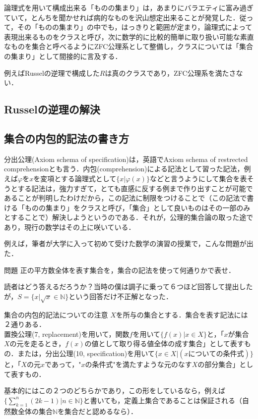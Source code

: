 \documentclass[uplatex, 12pt, a4paper, dvipdfmx]{jsreport}
\begin{document}
論理式を用いて構成出来る「ものの集まり」は，あまりにバラエティに富み過ぎていて，とんちを聞かせれば病的なものを沢山想定出来ることが発覚した．従って，その「ものの集まり」の中でも，はっきりと範囲が定まり，論理式によって表現出来るものをクラスと呼び，次に数学的に比較的簡単に取り扱い可能な素直なものを集合と呼べるようにZFC公理系として整備し，クラスについては「集合の集まり」として間接的に言及する．\par
例えばRusselの逆理で構成した$R$は真のクラスであり，ZFC公理系を満たさない．

\subsection{Russelの逆理の解決}

\subsection{集合の内包的記法の書き方}
分出公理(Axiom schema of specification)は，英語でAxiom schema of restrected comprehensionとも言う．内包(comprehension)による記法として習った記法，例えば$\varphi$を$x$を変項とする論理式として$\{ x | \varphi (x) \}$などと言うようにして集合を表そうとする記法は，強力すぎて，とても直感に反する例まで作り出すことが可能であることが判明したわけだから，この記法に制限をつけることで（この記法で書ける「ものの集まり」をクラスと呼び，「集合」として良いものはその一部のみとすることで）解決しようというのである．それが，公理的集合論の取った途であり，現行の数学はその上に咲いている．\par
例えば，筆者が大学に入って初めて受けた数学の演習の授業で，こんな問題が出た．

\begin{itembox}[l]{問題}
	正の平方数全体を表す集合を，集合の記法を使って何通りかで表せ．
\end{itembox}
読者はどう答えるだろうか？当時の僕は調子に乗って６つほど回答して提出したが，$S=\{ x | \sqrt{x} \in \mathbb{N} \}$という回答だけ不正解となった．
\begin{itembox}[l]{集合の内包的記法についての注意}
	$X$を所与の集合とする．集合を表す記法には２通りある．\\
	置換公理(7, replacement)を用いて，関数$f$を用いて$\{ f(x) | x\in X \}$と，「$x$が集合$X$の元を走るとき，$f(x)$の値として取り得る値全体の成す集合」として表すもの．または，分出公理(10, specification)を用いて$\{ x\in X | (xについての条件式) \}$と，「$X$の元$x$であって，"$x$の条件式"を満たすような元のなす$X$の部分集合」として表すもの．
\end{itembox}
基本的にはこの２つのどちらかであり，この形をしているなら，例えば$\{ \sum^n_{k=1} (2k-1) | n\in\mathbb{N} \}$と書いても，定義上集合であることは保証される（自然数全体の集合$\mathbb{N}$を集合だと認めるなら）．
\end{document}
